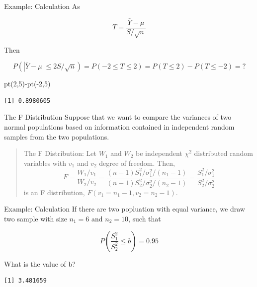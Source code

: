 \documentclass[
  ignorenonframetext,
  aspectratio=43,
]{beamer}
\newenvironment{Shaded}{\begin{snugshade}}{\end{snugshade}}
\newcommand{\DecValTok}[1]{\textcolor[rgb]{0.68,0.00,0.00}{#1}}
\newcommand{\FunctionTok}[1]{\textcolor[rgb]{0.28,0.35,0.67}{#1}}
\newcommand{\NormalTok}[1]{\textcolor[rgb]{0.00,0.23,0.31}{#1}}
\newcommand{\SpecialCharTok}[1]{\textcolor[rgb]{0.37,0.37,0.37}{#1}}
\begin{document}
\begin{frame}[fragile]{Example: Calculation}
\label{example-calculation-1}
As

\[
T=\frac{\bar{Y}-\mu}{S/\sqrt{n}}
\]

Then

\[
P(|\bar{Y}-\mu|\leq 2S/\sqrt{n})=P(-2\leq T \leq 2)= P(T\leq 2)-P(T\leq -2)=?
\]

\begin{Shaded}
\begin{Highlighting}[]
\FunctionTok{pt}\NormalTok{(}\DecValTok{2}\NormalTok{,}\DecValTok{5}\NormalTok{)}\SpecialCharTok{{-}}\FunctionTok{pt}\NormalTok{(}\SpecialCharTok{{-}}\DecValTok{2}\NormalTok{,}\DecValTok{5}\NormalTok{)}
\end{Highlighting}
\end{Shaded}

\begin{verbatim}
[1] 0.8980605
\end{verbatim}
\end{frame}

\begin{frame}{The F Distribution}
\label{the-f-distribution}
Suppose that we want to compare the variances of two normal populations
based on information contained in independent random samples from the
two populations.

\begin{quote}
The F Distribution: Let \(W_1\) and \(W_2\) be independent \(\chi^2\)
distributed random variables with \(v_1\) and \(v_2\) degree of freedom.
Then, \[
F=\frac{W_1/v_1}{W_2/v_2}=\frac{(n-1)S^2_1/\sigma^2_1/(n_1-1)}{(n-1)S^2_2/\sigma^2_2/(n_2-1)}=\frac{S^2_1/\sigma^2_1}{S^2_2/\sigma^2_2}
\] is an F distribution, \(F(v_1=n_1-1,v_2=n_2-1)\).
\end{quote}
\end{frame}

\begin{frame}[fragile]{Example: Calculation}
\label{example-calculation-2}
If there are two popluation with equal variance, we draw two sample with
size \(n_1=6\) and \(n_2=10\), such that

\[
P(\frac{S^2_1}{S^2_2} \leq b)=0.95
\]

What is the value of b?

\begin{verbatim}
[1] 3.481659
\end{verbatim}
\end{frame}
\end{document}
